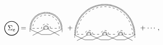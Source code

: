 \documentclass[aps,pra,groupedaddress,onecolumn,notitlepage,superscriptaddress,10pt]{revtex4-1}
\begin{document}
\begin{align}
\tikz[baseline=-0.5ex]{
    \draw[thick] (0,0) circle (10pt) node[anchor=center] {$\Sigma_e$};
    }
=& \ \,
\tikz[scale=0.45,baseline=-0.5ex]{
    \draw[dashed] (0,0) -- (1,0);
    \draw (-0.2,0.)-- (-0.2,-0.15);
    \draw (-0.2,-0.15)-- (1.,-0.7);
    \draw (1.2,-0.15)-- (1.2,0.0);
    \draw (1.2,-0.15)-- (0,-0.8);
    \draw[densely dotted,thick] (-0.3,0.)-- (-0.3,-0.4);
    \draw[densely dotted,thick] (1.3,-0.1)-- (1.3,0.);
    \draw[dashed] (2,0) -- (3,0);
    \draw (1.8,0.)-- (1.8,-0.15);
    \draw (1.8,-0.15)-- (3.,-0.8);
    \draw (3.2,-0.15)-- (3.2,0.);
    \draw (3.2,-0.15)-- (2,-0.7);
    \draw[densely dotted,thick] (1.7,0.)-- (1.7,-0.1);
    \draw[densely dotted,thick] (3.3,-0.4)-- (3.3,0.);
    \draw[densely dotted,thick] (1.3,-0.1)--(1.7,-0.1);
    \draw (1.0,-0.7)-- (2,-0.7);
    \draw[densely dotted,thick] (3.3,0) arc (0:180:1.8);
    \draw[densely dotted,thick] (1.7,0) arc (0:180:0.2);
    \draw[dashed] (2.0,0) arc (0:180:0.5);
    \draw[dashed] (3.0,0) arc (0:180:1.5);
    \draw (1.8,0) arc (0:180:0.3);
    \draw (3.2,0) arc (0:180:1.7);
 }
\ \,
+
\tikz[scale=0.4,baseline=1.5ex]{
    \draw[dashed] (0,0) -- (1,0);
    \draw (-0.2,0.)-- (-0.2,-0.15);
    \draw (-0.2,-0.15)-- (1.,-0.7);
    \draw (1.2,-0.15)-- (1.2,0.0);
    \draw (1.2,-0.15)-- (0,-0.8);
    \draw[densely dotted,thick] (-0.3,0.)-- (-0.3,-0.4);
    \draw[densely dotted,thick] (1.3,-0.1)-- (1.3,0.);
    \draw[dashed] (2,0) -- (3,0);
    \draw (1.8,0.)-- (1.8,-0.15);
    \draw (1.8,-0.15)-- (3.,-0.7);
    \draw (3.2,-0.15)-- (3.2,0.);
    \draw (3.2,-0.15)-- (2,-0.7);
    \draw[densely dotted,thick] (1.7,0.)-- (1.7,-0.1);
    \draw[densely dotted,thick] (3.3,-0.1)-- (3.3,0.);
    \draw[dashed] (4,0) -- (5,0);
    \draw (3.8,0.)-- (3.8,-0.15);
    \draw (3.8,-0.15)-- (5.,-0.7);
    \draw (5.2,-0.15)-- (5.2,0.);
    \draw (5.2,-0.15)-- (4,-0.7);
    \draw[densely dotted,thick] (3.7,0.)-- (3.7,-0.1);
    \draw[densely dotted,thick] (5.3,-0.1)-- (5.3,0.);
    \draw[dashed] (6,0) -- (7,0);
    \draw (5.8,0.)-- (5.8,-0.15);
    \draw (5.8,-0.15)-- (7.,-0.8);
    \draw (7.2,-0.15)-- (7.2,0.);
    \draw (7.2,-0.15)-- (6,-0.7);
    \draw[densely dotted,thick] (5.7,0.)-- (5.7,-0.1);
    \draw[densely dotted,thick] (7.3,-0.4)-- (7.3,0.);
    \draw[densely dotted,thick] (1.3,-0.1)--(1.7,-0.1);
    \draw[densely dotted,thick] (3.3,-0.1)--(3.7,-0.1);
    \draw[densely dotted,thick] (5.3,-0.1)--(5.7,-0.1);
    \draw (1.0,-0.7)-- (2,-0.7);
    \draw (3.0,-0.7)-- (4,-0.7);
    \draw (5.0,-0.7)-- (6,-0.7);
    \draw[densely dotted,thick] (7.3,0) arc (0:180:3.8);
    \draw[densely dotted,thick] (1.7,0) arc (0:180:0.2);
    \draw[densely dotted,thick] (3.7,0) arc (0:180:0.2);
    \draw[densely dotted,thick] (5.7,0) arc (0:180:0.2);
    \draw[dashed] (6.0,0) arc (0:180:0.5);
    \draw[dashed] (4.0,0) arc (0:180:0.5);
    \draw[dashed] (2.0,0) arc (0:180:0.5);
    \draw[dashed] (7.0,0) arc (0:180:3.5);
    \draw (5.8,0) arc (0:180:0.3);
    \draw (3.8,0) arc (0:180:0.3);
    \draw (1.8,0) arc (0:180:0.3);
    \draw (7.2,0) arc (0:180:3.7);
 }
 \ \,
+
\cdots,
\end{align}
\end{document}
